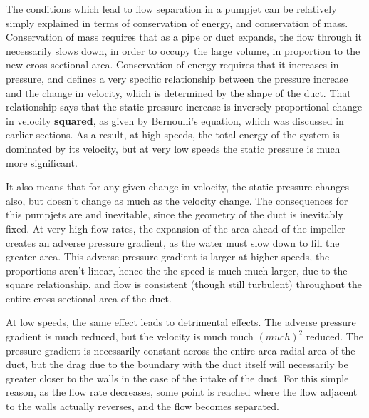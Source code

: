 \documentclass{article}\usepackage[]{graphicx}\usepackage[]{color}
\begin{document}
The conditions which lead to flow separation in a pumpjet can be relatively simply explained in terms of conservation of energy, and conservation of mass. Conservation of mass requires that as a pipe or duct expands, the flow through it necessarily slows down, in order to occupy the large volume, in proportion to the new cross-sectional area.  Conservation of energy requires that it increases in pressure, and defines a very specific relationship between the pressure increase and the change in velocity, which is determined by the shape of the duct.  That relationship says that the static pressure increase is inversely proportional change in velocity \textbf{squared}, as given by Bernoulli's equation, which was discussed in earlier sections.  As a result, at high speeds, the total energy of the system is dominated by its velocity, but at very low speeds the static pressure is much more significant.

It also means that for any given change in velocity, the static pressure changes also, but doesn't change as much as the velocity change.  The consequences for this pumpjets are and inevitable, since the geometry of the duct is inevitably fixed.  At very high flow rates, the expansion of the area ahead of the impeller creates an adverse pressure gradient, as the water must slow down to fill the greater area.  This adverse pressure gradient is larger at higher speeds, the proportions aren't linear, hence the the speed is much much larger, due to the square relationship, and flow is consistent (though still turbulent) throughout the entire cross-sectional area of the duct.

At low speeds, the same effect leads to detrimental effects.  The adverse pressure gradient is much reduced, but the velocity is much much $(much)^2$ reduced. The pressure gradient is necessarily constant across the entire area radial area of the duct, but the drag due to the boundary with the duct itself will necessarily be greater closer to the walls in the case of the intake of the duct.  For this simple reason, as the flow rate decreases, some point is reached where the flow adjacent to the walls actually reverses, and the flow becomes separated.
\end{document}
